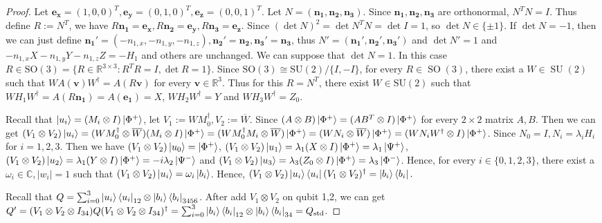 \begin{proof}
    Let $\mathbf{e_x}=(1,0,0)^T,\mathbf{e_y}=(0,1,0)^T,\mathbf{e_z}=(0,0,1)^T$. Let $N=(\mathbf{n_1,n_2,n_3})$. Since $\mathbf{n_1,n_2,n_3}$ are orthonormal, $N^TN=I$. Thus define $R:=N^T$, we have $R\mathbf{n_1}=\mathbf{e_x}, R\mathbf{n_2}=\mathbf{e_y}, R\mathbf{n_3}=\mathbf{e_z}$. Since $(\det N)^2=\det N^TN=\det I=1$, so $\det N\in\{\pm1\}$. If $\det N=-1$, then we can just define $\mathbf{n_1'}=(-n_{1,x},-n_{1,y},-n_{1,z}), \mathbf{n_2'}=\mathbf{n_2},\mathbf{n_3'}=\mathbf{n_3}$, thus $N'=(\mathbf{n_1',n_2',n_3'})$ and $\det N'=1$ and $-n_{1,x}X-n_{1,y}Y-n_{1,z}Z=-H_1$ and others are unchanged. We can suppose that $\det N=1$. In this case $R\in \mathrm{SO}(3)=\{R\in \mathbb{R}^{3\times 3}: R^TR=I, \det R=1\}$. Since $\mathrm{SO}(3)\cong \mathrm{SU}(2)/\{I,-I\}$, for every $R\in \operatorname{SO}(3)$, there exist a $W\in \operatorname{SU}(2)$ such that $WA(\mathbf{v})W^\dagger=A(R\mathbf{v})$ for every $\mathbf{v}\in \mathbb{R}^3$. Thus for this $R=N^T$, there exist $W\in \mathrm{SU}(2)$ such that $WH_1W^\dagger=A(R\mathbf{n_1})=A(\mathbf{e_1})=X$, $WH_2W^\dagger=Y$ and $WH_3W^\dagger=Z_0$.

    Recall that $\ket{u_i}=(M_i\otimes I)\ket{\Phi^+}$, let $V_1:=WM_0^\dagger,V_2:=\overline{W}$. Since $(A\otimes B)\ket{\Phi^+}=(AB^T\otimes I)\ket{\Phi^+}$ for every $2\times 2$ matrix $A,B$.
    Then we can get $(V_1\otimes V_2)\ket{u_i}=(WM_0^\dagger\otimes \overline{W})(M_i\otimes I)\ket{\Phi^+}=(WM_0^\dagger M_i\otimes \overline{W})\ket{\Phi^+}=(WN_i\otimes \overline{W})\ket{\Phi^+}=(WN_iW^\dagger \otimes I)\ket{\Phi^+}$. Since $N_0=I,N_i=\lambda_i H_i$ for $i=1,2,3$. Then we have $(V_1\otimes V_2)\ket{u_0}=\ket{\Phi^+}$, $(V_1\otimes V_2)\ket{u_1}=\lambda_1(X\otimes I)\ket{\Phi^+}=\lambda_1\ket{\Psi^+}$, $(V_1\otimes V_2)\ket{u_2}=\lambda_1(Y\otimes I)\ket{\Phi^+}=-i\lambda_2\ket{\Psi^-}$ and $(V_1\otimes V_2)\ket{u_3}=\lambda_3(Z_0\otimes I)\ket{\Phi^+}=\lambda_3\ket{\Phi^-}$. Hence, for every $i\in\{0,1,2,3\}$, there exist a $\omega_i\in \mathbb{C},\lvert w_i\rvert=1$ such that $(V_1\otimes V_2)\ket{u_i}=\omega_i\ket{b_i}$. Hence, $(V_1\otimes V_2)\ket{u_i}\bra{u_i}(V_1\otimes V_2)^\dagger=\ket{b_i}\bra{b_i}.$

    Recall that $Q=\sum_{i=0}^3\ket{u_i}\bra{u_i}_{12}\otimes \ket{b_i}\bra{b_i}_{3456}$. After add $V_1\otimes V_2$ on qubit 1,2, we can get $Q'=(V_1\otimes V_2\otimes I_{34})Q(V_1\otimes V_2\otimes I_{34})^\dagger=\sum_{i=0}^3\ket{b_i}\bra{b_i}_{12}\otimes \ket{b_i}\bra{b_i}_{34}=Q_{\mathrm{std}}$.


\end{proof}
